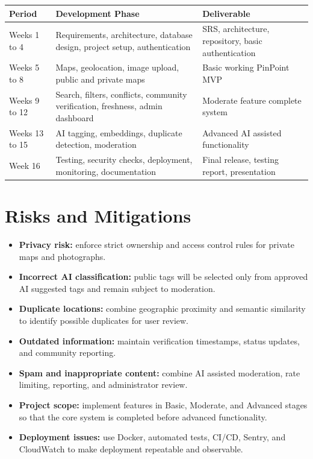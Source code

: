 \documentclass[11pt,a4paper]{article}
\begin{document}
\begin{center}
\renewcommand{\arraystretch}{1.25}
\begin{tabular}{|p{2.2cm}|p{5.2cm}|p{5.2cm}|}
\hline
\textbf{Period} & \textbf{Development Phase} & \textbf{Deliverable} \\
\hline
Weeks 1 to 4 &
Requirements, architecture, database design, project setup, authentication &
SRS, architecture, repository, basic authentication \\
\hline
Weeks 5 to 8 &
Maps, geolocation, image upload, public and private maps &
Basic working PinPoint MVP \\
\hline
Weeks 9 to 12 &
Search, filters, conflicts, community verification, freshness, admin dashboard &
Moderate feature complete system \\
\hline
Weeks 13 to 15 &
AI tagging, embeddings, duplicate detection, moderation &
Advanced AI assisted functionality \\
\hline
Week 16 &
Testing, security checks, deployment, monitoring, documentation &
Final release, testing report, presentation \\
\hline
\end{tabular}
\end{center}

\section{Risks and Mitigations}

\begin{itemize}[leftmargin=0.7cm]
    \item \textbf{Privacy risk:} enforce strict ownership and access control
    rules for private maps and photographs.
    
    \item \textbf{Incorrect AI classification:} public tags will be selected
    only from approved AI suggested tags and remain subject to moderation.
    
    \item \textbf{Duplicate locations:} combine geographic proximity and
    semantic similarity to identify possible duplicates for user review.
    
    \item \textbf{Outdated information:} maintain verification timestamps,
    status updates, and community reporting.
    
    \item \textbf{Spam and inappropriate content:} combine AI assisted
    moderation, rate limiting, reporting, and administrator review.
    
    \item \textbf{Project scope:} implement features in Basic, Moderate, and
    Advanced stages so that the core system is completed before advanced
    functionality.
    
    \item \textbf{Deployment issues:} use Docker, automated tests, CI/CD,
    Sentry, and CloudWatch to make deployment repeatable and observable.
\end{itemize}
\end{document}
